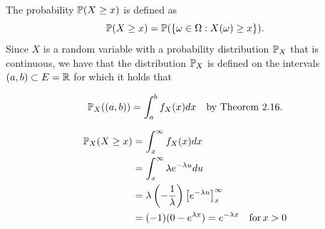 
The probability $ \P(X \geq x) $ is defined as 
\[
    \P(X \geq x) = \P( \{ \omega \in \Omega: X(\omega) \geq x \} )
.\] 
Since $ X$ is a random variable with a probability  
distribution $ \P_{X} $  that is continuous, we 
have that the distribution $ \P_{X} $  is defined on the intervals $ (a,b) \subset E = \R$
for which it holds that 

\[
    \P_{X}((a,b)) = \int_{a}^{b} f_{X} (x) dx \quad \mbox{by Theorem 2.16} 
.\] 

\begin{align*}
    \P_{X} (X \geq x) &= \int_{x}^{\infty} f_{X} (x) dx \\
		      &= \int_{x}^{\infty} \lambda e^{-\lambda u} du\\
		      &= \lambda \left(- \frac{1}{\lambda}  \right) \left[ e^{-\lambda u}
		  \right]_{x}^{\infty} \\
		      &= (-1) (0 - e^{\lambda x} ) = e^{-\lambda x} \quad \mbox{for} \, x > 0
\end{align*}
